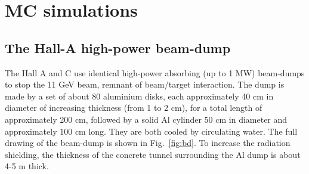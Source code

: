 \section{MC simulations}
\label{sec:sim}
\subsection{The Hall-A high-power beam-dump}
The Hall A and C use identical high-power absorbing (up to 1 MW)  beam-dumps to stop the 11 GeV beam, remnant of beam/target interaction. The dump is made by a set of about 80 aluminium disks, each
approximately 40 cm in diameter of increasing thickness (from 1 to 2 cm), for a total
length of approximately 200 cm, followed by a solid Al cylinder 50 cm in diameter
and approximately 100 cm long. They are both cooled by circulating water. The full
drawing of the beam-dump is shown in Fig.~\ref{fig:bd}. To increase the radiation shielding,
the thickness of the concrete tunnel surrounding the Al dump is about 4-5 m thick.

